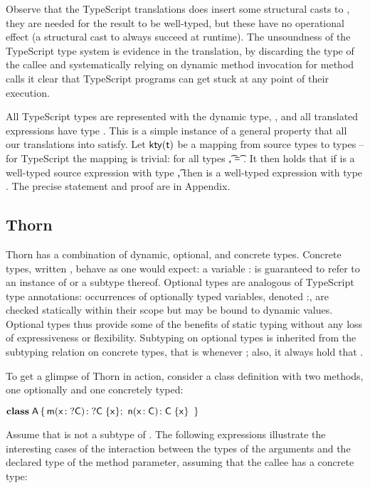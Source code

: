\documentclass[acmlarge, anonymous, authordraft, review]{acmart} %
\begin{document}
\noindent
Observe that the TypeScript translations does insert some structural casts
to \any, they are needed for the result to be well-typed, but these have no
operational effect (a structural cast to \any always succeed at runtime).
The unsoundness of the TypeScript type system is evidence in the
translation, by discarding the type of the callee and systematically relying
on dynamic method invocation for method calls it clear that TypeScript
programs can get stuck at any point of their execution.


All TypeScript types are represented with the dynamic \kafka type, \any, and
all translated expressions have type \any.  This is a simple instance of a
general property that all our translations into \kafka satisfy.  Let
\(\kty\t\) be a mapping from source types to \kafka types -- for TypeScript
the mapping is trivial: for all types \t, \kty\t = \src{\any}.  It then
holds that if \e is a well-typed source expression with type \t, then
\TR{\e} is a well-typed \kafka expression with type \kty{\t}.  The precise
statement and proof are in Appendix.


\subsection{Thorn}

Thorn has a combination of dynamic, optional, and concrete types.  Concrete
types, written \C, behave as one would expect: a variable {\x:\C} is
guaranteed to refer to an instance of \C or a subtype thereof.  Optional
types are analogous of TypeScript type annotations: occurrences of
optionally typed variables, denoted {\x:\dt\C}, are checked statically
within their scope but may be bound to dynamic values.  Optional types thus
provide some of the benefits of static typing without any loss of
expressiveness or flexibility.  Subtyping on optional types is inherited
from the subtyping relation on concrete types, that is {\dt\C} \Sub {\dt\D}
whenever \C \Sub \D; also, it always hold that \C \Sub \dt\C.

To get a
glimpse of Thorn in action, consider a class definition with two methods,
one optionally and one concretely typed:

\medskip
\(
 \Class \A {
    \Mdef \m\x{\dt\C} {\dt\C}  \x  ; \ 
    \Mdef \n\x\C\C  \x 
    }
\)
\medskip

\noindent Assume that \D is not a subtype of \C.  The following expressions
illustrate the interesting cases of the interaction between the types of the
arguments and the declared type of the method parameter, assuming that the
callee has a concrete type:
\end{document}
